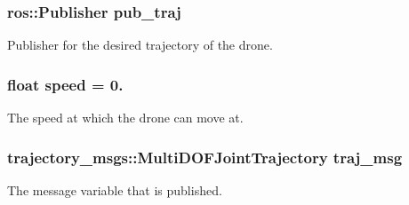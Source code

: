\subsubsection[{\texorpdfstring{pub\+\_\+traj}{pub_traj}}]{\setlength{\rightskip}{0pt plus 5cm}ros\+::\+Publisher pub\+\_\+traj}\hypertarget{oculus-control_8cpp_a92b67ae724bc0d23b8e85e92e89403df}{}\label{oculus-control_8cpp_a92b67ae724bc0d23b8e85e92e89403df}


Publisher for the desired trajectory of the drone. 

\subsubsection[{\texorpdfstring{speed}{speed}}]{\setlength{\rightskip}{0pt plus 5cm}float speed = 0.}\hypertarget{oculus-control_8cpp_a7f7e4724cf57d59513b39c5ecc81adc8}{}\label{oculus-control_8cpp_a7f7e4724cf57d59513b39c5ecc81adc8}


The speed at which the drone can move at. 

\subsubsection[{\texorpdfstring{traj\+\_\+msg}{traj_msg}}]{\setlength{\rightskip}{0pt plus 5cm}trajectory\+\_\+msgs\+::\+Multi\+D\+O\+F\+Joint\+Trajectory traj\+\_\+msg}\hypertarget{oculus-control_8cpp_a090c0766fbb77862dd8cc0cca99d688b}{}\label{oculus-control_8cpp_a090c0766fbb77862dd8cc0cca99d688b}


The message variable that is published. 

